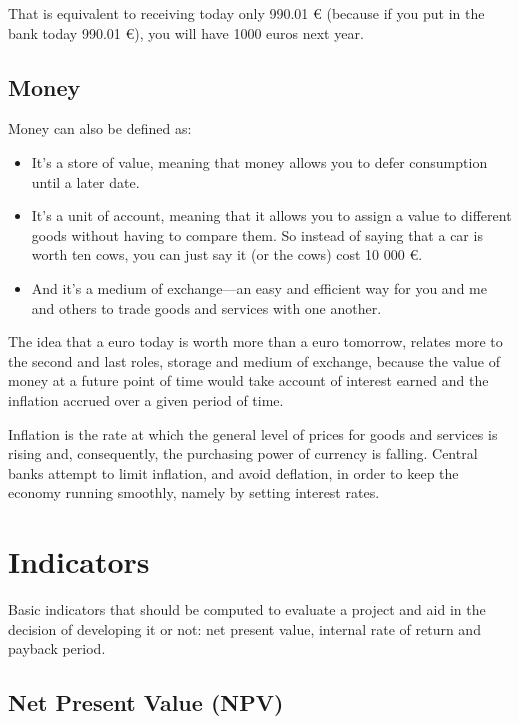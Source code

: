 \documentclass[]{book}
\newcommand{\euro}{€}
\providecommand{\tightlist}{%
  \setlength{\itemsep}{0pt}\setlength{\parskip}{0pt}}
\theoremstyle{definition}
\theoremstyle{definition}
\theoremstyle{definition}
\theoremstyle{remark}
\begin{document}
That is equivalent to receiving today only 990.01 \euro{} (because if
you put in the bank today 990.01 \euro{}), you will have 1000 euros next
year.

\subsection{Money}\label{money}

Money can also be defined as:

\begin{itemize}
\tightlist
\item
  It's a store of value, meaning that money allows you to defer
  consumption until a later date.
\item
  It's a unit of account, meaning that it allows you to assign a value
  to different goods without having to compare them. So instead of
  saying that a car is worth ten cows, you can just say it (or the cows)
  cost 10 000 \euro{}.
\item
  And it's a medium of exchange---an easy and efficient way for you and
  me and others to trade goods and services with one another.
\end{itemize}

The idea that a euro today is worth more than a euro tomorrow, relates
more to the second and last roles, storage and medium of exchange,
because the value of money at a future point of time would take account
of interest earned and the inflation accrued over a given period of
time.

Inflation is the rate at which the general level of prices for goods and
services is rising and, consequently, the purchasing power of currency
is falling. Central banks attempt to limit inflation, and avoid
deflation, in order to keep the economy running smoothly, namely by
setting interest rates.

\section{Indicators}\label{indicators}

Basic indicators that should be computed to evaluate a project and aid
in the decision of developing it or not: net present value, internal
rate of return and payback period.

\subsection{Net Present Value (NPV)}\label{net-present-value-npv}
\end{document}
